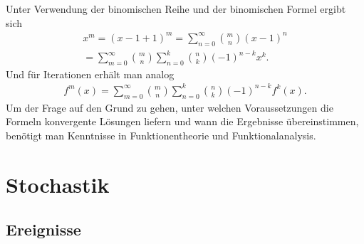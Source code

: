 \documentclass[a4paper,10pt,fleqn,twocolumn,twoside]{article}
\numberwithin{equation}{section}
\begin{document}
Unter Verwendung der binomischen Reihe und der binomischen Formel
ergibt sich
\begin{gather*}
x^m = (x-1+1)^m = \sum_{n=0}^\infty \binom{m}{n}(x-1)^n\\
= \sum_{m=0}^\infty \binom{m}{n}\sum_{n=0}^k\binom{n}{k}(-1)^{n-k}x^k.
\end{gather*}
Und für Iterationen erhält man analog
\begin{gather*}
f^m(x) = \sum_{m=0}^\infty \binom{m}{n}
\sum_{n=0}^k\binom{n}{k}(-1)^{n-k}f^k(x).
\end{gather*}
Um der Frage auf den Grund zu gehen, unter welchen Voraussetzungen
die Formeln konvergente Lösungen liefern und wann die Ergebnisse
übereinstimmen, benötigt man Kenntnisse in Funktionentheorie
und Funktionalanalysis.


\newpage
\section{Stochastik}
\subsection{Ereignisse}
\end{document}
